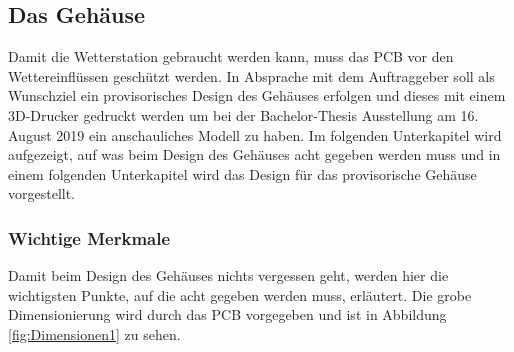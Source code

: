 \subsection{Das Gehäuse}
\label{subsec:HW:Gehaeuse}
Damit die Wetterstation gebraucht werden kann, muss das PCB vor den Wettereinflüssen geschützt werden. In Absprache mit dem Auftraggeber soll als Wunschziel ein provisorisches Design des Gehäuses erfolgen und dieses mit einem 3D-Drucker gedruckt werden um bei der Bachelor-Thesis Ausstellung am 16. August 2019 ein anschauliches Modell zu haben. Im folgenden Unterkapitel wird aufgezeigt, auf was beim Design des Gehäuses acht gegeben werden muss und in einem folgenden Unterkapitel wird das Design für das provisorische Gehäuse vorgestellt.

\subsubsection{Wichtige Merkmale}
Damit beim Design des Gehäuses nichts vergessen geht, werden hier die wichtigsten Punkte, auf die acht gegeben werden muss, erläutert. Die grobe Dimensionierung wird durch das PCB vorgegeben und ist in Abbildung \ref{fig:Dimensionen1} zu sehen.


